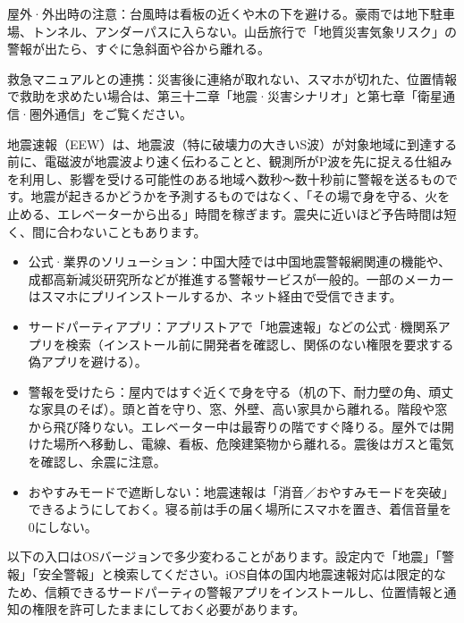 屋外·外出時の注意：台風時は看板の近くや木の下を避ける。豪雨では地下駐車場、トンネル、アンダーパスに入らない。山岳旅行で「地質災害気象リスク」の警報が出たら、すぐに急斜面や谷から離れる。

救急マニュアルとの連携：災害後に連絡が取れない、スマホが切れた、位置情報で救助を求めたい場合は、第三十二章「地震·災害シナリオ」と第七章「衛星通信·圏外通信」をご覧ください。


地震速報（EEW）は、地震波（特に破壊力の大きいS波）が対象地域に到達する前に、電磁波が地震波より速く伝わることと、観測所がP波を先に捉える仕組みを利用し、影響を受ける可能性のある地域へ数秒〜数十秒前に警報を送るものです。地震が起きるかどうかを予測するものではなく、「その場で身を守る、火を止める、エレベーターから出る」時間を稼ぎます。震央に近いほど予告時間は短く、間に合わないこともあります。

\begin{itemize}
  \item 公式·業界のソリューション：中国大陸では中国地震警報網関連の機能や、成都高新減災研究所などが推進する警報サービスが一般的。一部のメーカーはスマホにプリインストールするか、ネット経由で受信できます。
  \item サードパーティアプリ：アプリストアで「地震速報」などの公式·機関系アプリを検索（インストール前に開発者を確認し、関係のない権限を要求する偽アプリを避ける）。
  \item 警報を受けたら：屋内ではすぐ近くで身を守る（机の下、耐力壁の角、頑丈な家具のそば）。頭と首を守り、窓、外壁、高い家具から離れる。階段や窓から飛び降りない。エレベーター中は最寄りの階ですぐ降りる。屋外では開けた場所へ移動し、電線、看板、危険建築物から離れる。震後はガスと電気を確認し、余震に注意。
  \item おやすみモードで遮断しない：地震速報は「消音／おやすみモードを突破」できるようにしておく。寝る前は手の届く場所にスマホを置き、着信音量を0にしない。
\end{itemize}


以下の入口はOSバージョンで多少変わることがあります。設定内で「地震」「警報」「安全警報」と検索してください。iOS自体の国内地震速報対応は限定的なため、信頼できるサードパーティの警報アプリをインストールし、位置情報と通知の権限を許可したままにしておく必要があります。


